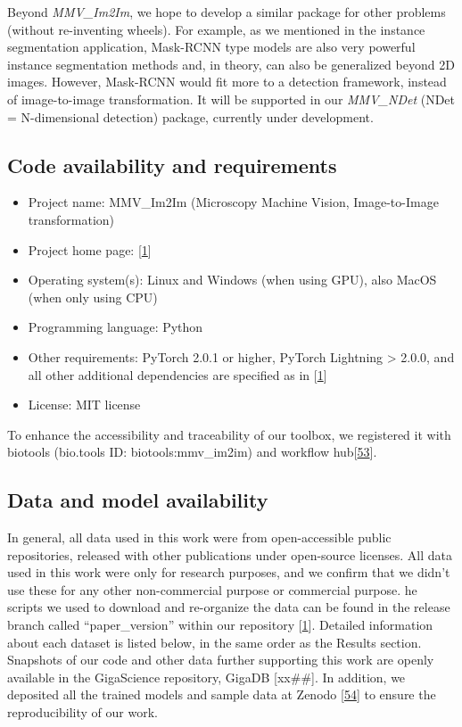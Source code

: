Beyond \emph{MMV\_Im2Im}, we hope to develop a similar package for other problems (without re-inventing wheels). For example, as we mentioned in the instance segmentation application, Mask-RCNN type models are also very powerful instance segmentation methods and, in theory, can also be generalized beyond 2D images. However, Mask-RCNN would fit more to a detection framework, instead of image-to-image transformation. It will be supported in our \emph{MMV\_NDet} (NDet = N-dimensional detection) package, currently under development.

\hypertarget{code-availability-and-requirements}{%
\subsection{Code availability and requirements}\label{code-availability-and-requirements}}

\begin{itemize}
\item
  Project name: MMV\_Im2Im (Microscopy Machine Vision, Image-to-Image transformation)
\item
  Project home page: {[}\protect\hyperlink{ref-10dtMviwb}{1}{]}
\item
  Operating system(s): Linux and Windows (when using GPU), also MacOS (when only using CPU)
\item
  Programming language: Python
\item
  Other requirements: PyTorch 2.0.1 or higher, PyTorch Lightning \textgreater{} 2.0.0, and all other additional dependencies are specified as in {[}\protect\hyperlink{ref-10dtMviwb}{1}{]}
\item
  License: MIT license
\end{itemize}

To enhance the accessibility and traceability of our toolbox, we registered it with biotools (bio.tools ID: biotools:mmv\_im2im) and workflow hub{[}\protect\hyperlink{ref-xl7YzUeX}{53}{]}.

\hypertarget{data-and-model-availability}{%
\subsection{Data and model availability}\label{data-and-model-availability}}

In general, all data used in this work were from open-accessible public repositories, released with other publications under open-source licenses. All data used in this work were only for research purposes, and we confirm that we didn't use these for any other non-commercial purpose or commercial purpose. he scripts we used to download and re-organize the data can be found in the release branch called ``paper\_version'' within our repository {[}\protect\hyperlink{ref-10dtMviwb}{1}{]}. Detailed information about each dataset is listed below, in the same order as the Results section. Snapshots of our code and other data further supporting this work are openly available in the GigaScience repository, GigaDB {[}xx\#\#{]}. In addition, we deposited all the trained models and sample data at Zenodo {[}\protect\hyperlink{ref-FBoj3fXM}{54}{]} to ensure the reproducibility of our work.

